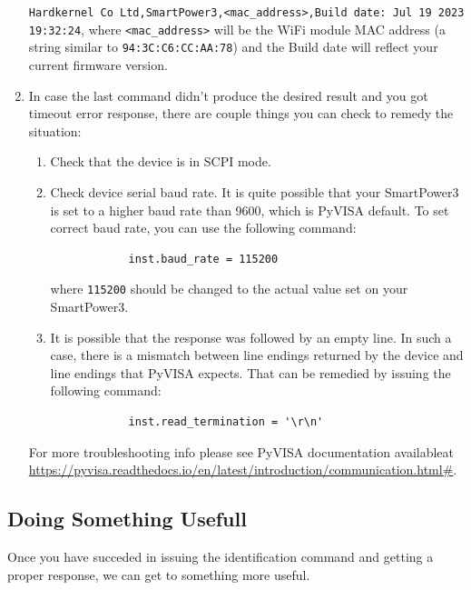 \documentclass[a4paper,10pt]{article}
\begin{document}
\begin{enumerate}
    \verb|Hardkernel Co Ltd,SmartPower3,<mac_address>,Build date: Jul 19 2023 19:32:24|, where \verb|<mac_address>| will be the WiFi module MAC address (a string similar to \newline\verb|94:3C:C6:CC:AA:78|) and the Build date will reflect your current firmware version.
    \item In case the last command didn't produce the desired result and you got timeout error response, there are couple things you can check to remedy the situation:
    \begin{enumerate}
        \item Check that the device is in SCPI mode.
        \item Check device serial baud rate. It is quite possible that your SmartPower3 is set to a higher baud rate than 9600, which is PyVISA default. To set correct baud rate, you can use the following command:
        \begin{verbatim}
            inst.baud_rate = 115200
        \end{verbatim}
        where \verb|115200| should be changed to the actual value set on your SmartPower3.
        \item It is possible that the response was followed by an empty line. In such a case, there is a mismatch between line endings returned by the device and line endings that PyVISA expects. That can be remedied by issuing the following command:
        \begin{verbatim}
            inst.read_termination = '\r\n'
        \end{verbatim}
    \end{enumerate}
    For more troubleshooting info please see PyVISA documentation available\newline at \href{https://pyvisa.readthedocs.io/en/latest/introduction/communication.html\#}{https://pyvisa.readthedocs.io/en/latest/introduction/communication.html\#}.
      
\end{enumerate}
\subsection{Doing Something Usefull}
Once you have succeded in issuing the identification command and getting a proper response, we can get to something more useful.
\end{document}
